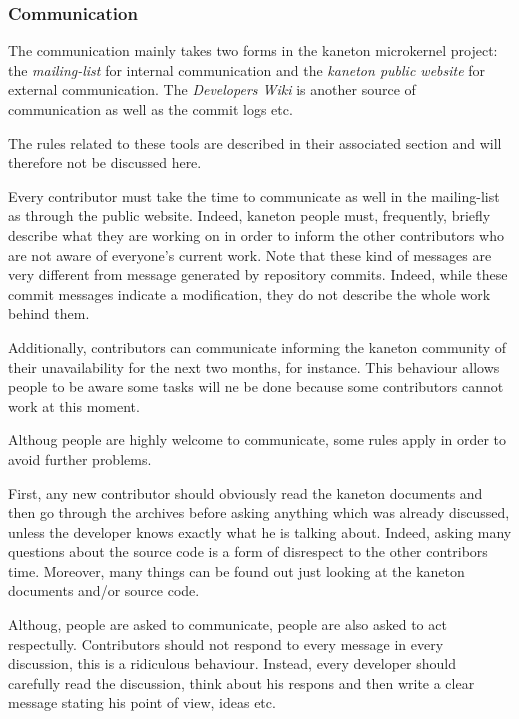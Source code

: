 
\subsubsection{Communication}

The communication mainly takes two forms in the kaneton microkernel project:
the \textit{mailing-list} for internal communication and the \textit{kaneton
public website} for external communication. The \textit{Developers Wiki}
is another source of communication as well as the commit logs etc.

The rules related to these tools are described in their associated section
and will therefore not be discussed here.

Every contributor must take the time to communicate as well in the mailing-list
as through the public website. Indeed, kaneton people must, frequently,
briefly describe what they are working on in order to inform the other
contributors who are not aware of everyone's current work. Note that these
kind of messages are very different from message generated by repository
commits. Indeed, while these commit messages indicate a modification, they
do not describe the whole work behind them.

Additionally, contributors can communicate informing the kaneton community of
their unavailability for the next two months, for instance. This behaviour
allows people to be aware some tasks will ne be done because some contributors
cannot work at this moment.

Althoug people are highly welcome to communicate, some rules apply in order
to avoid further problems.

First, any new contributor should obviously read the kaneton documents and
then go through the archives before asking anything which was already
discussed, unless the developer knows exactly what he is talking about.
Indeed, asking many questions about the source code is a form of disrespect
to the other contribors time. Moreover, many things can be found out just
looking at the kaneton documents and/or source code.

Althoug, people are asked to communicate, people are also asked to act
respectully. Contributors should not respond to every message in every
discussion, this is a ridiculous behaviour. Instead, every developer should
carefully read the discussion, think about his respons and then write a clear
message stating his point of view, ideas etc.

